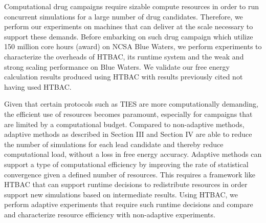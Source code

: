 Computational drug campaigns require sizable compute resources in order to 
run concurrent simulations for a large number of drug candidates. Therefore, 
we perform our experiments on machines that can deliver at the scale necessary 
to support these demands. 
Before embarking on such drug campaign which utilize 150 million core hours
(award) on NCSA Blue Waters, we perform experiments to characterize the 
overheads of HTBAC, its runtime system and the weak and strong scaling 
performance on Blue Waters. We validate our free energy calculation results 
produced using HTBAC with results previously cited not having used HTBAC. 

Given that certain protocols such as TIES are more computationally demanding, 
the efficient use of resources becomes paramount, especially for campaigns that 
are limited by a computational budget. Compared to non-adaptive 
methods, adaptive methods as described in Section III and Section IV are able to 
reduce the number of simulations for each lead candidate and thereby reduce
computational load, without a loss in free energy accuracy. Adaptive methods 
can support a type of computational efficiency by improving the rate of 
statistical convergence given a defined number of resources. This requires 
a framework like HTBAC that can support runtime decisions to redistribute 
resources in order support new simulations based on intermediate results. Using 
HTBAC, we perform adaptive experiments that require such runtime decisions and 
compare and characterize resource efficiency with non-adaptive experiments. 





